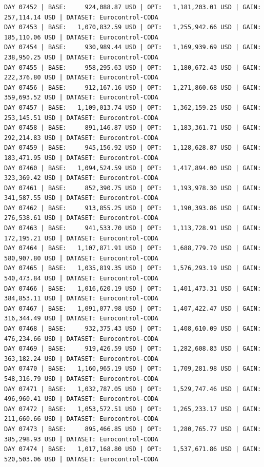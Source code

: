 \documentclass[11pt,a4paper]{article}
\begin{document}
\begin{verbatim}
DAY 07452 | BASE:     924,088.87 USD | OPT:   1,181,203.01 USD | GAIN: 257,114.14 USD | DATASET: Eurocontrol-CODA
DAY 07453 | BASE:   1,070,832.59 USD | OPT:   1,255,942.66 USD | GAIN: 185,110.06 USD | DATASET: Eurocontrol-CODA
DAY 07454 | BASE:     930,989.44 USD | OPT:   1,169,939.69 USD | GAIN: 238,950.25 USD | DATASET: Eurocontrol-CODA
DAY 07455 | BASE:     958,295.63 USD | OPT:   1,180,672.43 USD | GAIN: 222,376.80 USD | DATASET: Eurocontrol-CODA
DAY 07456 | BASE:     912,167.16 USD | OPT:   1,271,860.68 USD | GAIN: 359,693.52 USD | DATASET: Eurocontrol-CODA
DAY 07457 | BASE:   1,109,013.74 USD | OPT:   1,362,159.25 USD | GAIN: 253,145.51 USD | DATASET: Eurocontrol-CODA
DAY 07458 | BASE:     891,146.87 USD | OPT:   1,183,361.71 USD | GAIN: 292,214.83 USD | DATASET: Eurocontrol-CODA
DAY 07459 | BASE:     945,156.92 USD | OPT:   1,128,628.87 USD | GAIN: 183,471.95 USD | DATASET: Eurocontrol-CODA
DAY 07460 | BASE:   1,094,524.59 USD | OPT:   1,417,894.00 USD | GAIN: 323,369.42 USD | DATASET: Eurocontrol-CODA
DAY 07461 | BASE:     852,390.75 USD | OPT:   1,193,978.30 USD | GAIN: 341,587.55 USD | DATASET: Eurocontrol-CODA
DAY 07462 | BASE:     913,855.25 USD | OPT:   1,190,393.86 USD | GAIN: 276,538.61 USD | DATASET: Eurocontrol-CODA
DAY 07463 | BASE:     941,533.70 USD | OPT:   1,113,728.91 USD | GAIN: 172,195.21 USD | DATASET: Eurocontrol-CODA
DAY 07464 | BASE:   1,107,871.91 USD | OPT:   1,688,779.70 USD | GAIN: 580,907.80 USD | DATASET: Eurocontrol-CODA
DAY 07465 | BASE:   1,035,819.35 USD | OPT:   1,576,293.19 USD | GAIN: 540,473.84 USD | DATASET: Eurocontrol-CODA
DAY 07466 | BASE:   1,016,620.19 USD | OPT:   1,401,473.31 USD | GAIN: 384,853.11 USD | DATASET: Eurocontrol-CODA
DAY 07467 | BASE:   1,091,077.98 USD | OPT:   1,407,422.47 USD | GAIN: 316,344.49 USD | DATASET: Eurocontrol-CODA
DAY 07468 | BASE:     932,375.43 USD | OPT:   1,408,610.09 USD | GAIN: 476,234.66 USD | DATASET: Eurocontrol-CODA
DAY 07469 | BASE:     919,426.59 USD | OPT:   1,282,608.83 USD | GAIN: 363,182.24 USD | DATASET: Eurocontrol-CODA
DAY 07470 | BASE:   1,160,965.19 USD | OPT:   1,709,281.98 USD | GAIN: 548,316.79 USD | DATASET: Eurocontrol-CODA
DAY 07471 | BASE:   1,032,787.05 USD | OPT:   1,529,747.46 USD | GAIN: 496,960.41 USD | DATASET: Eurocontrol-CODA
DAY 07472 | BASE:   1,053,572.51 USD | OPT:   1,265,233.17 USD | GAIN: 211,660.66 USD | DATASET: Eurocontrol-CODA
DAY 07473 | BASE:     895,466.85 USD | OPT:   1,280,765.77 USD | GAIN: 385,298.93 USD | DATASET: Eurocontrol-CODA
DAY 07474 | BASE:   1,017,168.80 USD | OPT:   1,537,671.86 USD | GAIN: 520,503.06 USD | DATASET: Eurocontrol-CODA

\end{verbatim}
\end{document}
